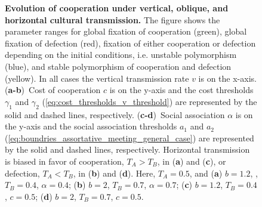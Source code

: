 \documentclass[12pt]{extarticle}
\begin{document}
\begin{figure}[p]
    \caption{\textbf{Evolution of cooperation under vertical, oblique, and horizontal cultural transmission.} 
    The figure shows the parameter ranges for global fixation of cooperation (green), global fixation of defection (red), fixation of either cooperation or defection depending on the initial conditions, i.e. unstable polymorphism (blue), and stable polymorphism of cooperation and defection (yellow).
	In all cases the vertical transmission rate $v$ is on the x-axis.
	(\textbf{a-b})~Cost of cooperation $c$ is on the y-axis and the cost thresholds $\gamma_1$ and $\gamma_2$ (\autoref{eq:cost_thresholds_v_threshold}) are represented by the solid and dashed lines, respectively. 
    (\textbf{c-d})~Social association $\alpha$ is on the y-axis and the social association thresholds $a_1$ and $a_2$ (\autoref{eq:boundries_assortative_meeting_general_case}) are represented by the solid and dashed lines, respectively. 
    Horizontal transmission is biased in favor of cooperation, $T_A>T_B$, in (\textbf{a}) and (\textbf{c}), or defection, $T_A<T_B$, in (\textbf{b}) and (\textbf{d}).    
    Here, $T_A = 0.5$, and
    (\textbf{a}) $b=1.2$, , $T_B = 0.4$, $\alpha = 0.4$;
    (\textbf{b}) $b=2$, $T_B = 0.7$, $\alpha = 0.7$;
    (\textbf{c}) $b=1.2$, $T_B = 0.4$, $c=0.5$;
    (\textbf{d}) $b=2$, $T_B = 0.7$, $c=0.5$.
    }
    \label{fig:result3}
\end{figure}
\end{document}
